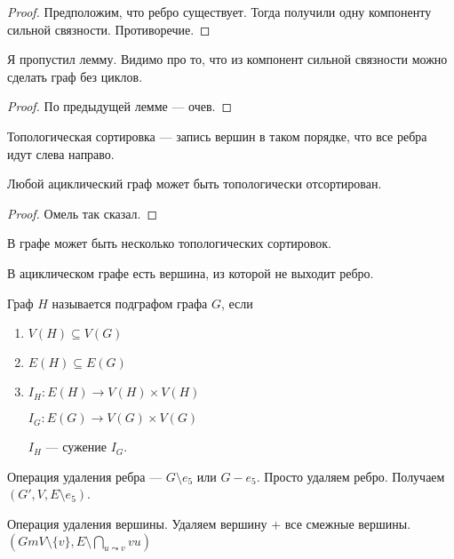 \begin{proof}
    Предположим, что ребро существует. Тогда получили одну компоненту сильной связности. Противоречие.
\end{proof}
\begin{lemma}
    Я пропустил лемму. Видимо про то, что из компонент сильной связности можно сделать граф без циклов.
\end{lemma}
\begin{proof}
    По предыдущей лемме --- очев.
\end{proof}
\begin{definition}
    Топологическая сортировка --- запись вершин в таком порядке, что все ребра идут слева направо.
\end{definition}
\begin{statement}
    Любой ациклический граф может быть топологически отсортирован.
\end{statement}
\begin{proof}
    Омель так сказал.
\end{proof}
\begin{remark}
    В графе может быть несколько топологических сортировок.
\end{remark}
\begin{consequence}
    В ациклическом графе есть вершина, из которой не выходит ребро.
\end{consequence}
\begin{definition}
    Граф $H$ называется подграфом графа  $G$, если 
     \begin{enumerate}
         \item $V(H) \subseteq V(G)$
         \item  $E(H) \subseteq E(G)$ 
         \item $I_H\!: E(H) \to V(H) \times V(H)$

             $I_G: E(G) \to V(G) \times V(G)$

              $I_H$ --- сужение  $I_G$.
    \end{enumerate}
\end{definition}
\begin{definition}
    Операция удаления ребра --- $G \setminus e_5$ или $G - e_5$. Просто удаляем ребро. Получаем  $(G', V, E \setminus e_5)$.
\end{definition}
\begin{definition}
    Операция удаления вершины. Удаляем вершину + все смежные вершины. 
    $(Gm V \setminus \{v\}, E \setminus \bigcap_{u \leadsto v} vu)$
\end{definition}
